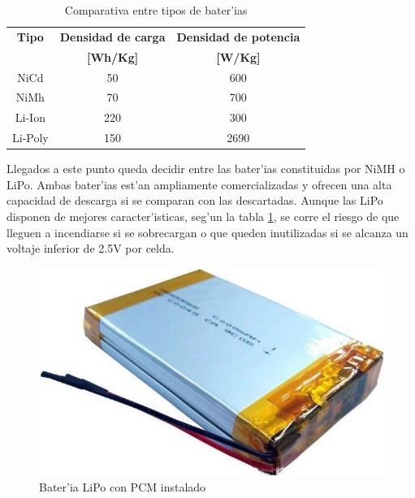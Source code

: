 \documentclass[twoside,12pt]{article}
\begin{document}
\begin{table}[ht]
\begin{center}
\begin{tabular}{|c|c|c|}
	\hline
	\textbf{Tipo} & \textbf{Densidad de carga} & \textbf{Densidad de potencia} \\ 
	\textbf{ } & \textbf{[Wh/Kg]} & \textbf{[W/Kg]} \\	\hline
	NiCd & 50 & 600 \\ \hline
	NiMh & 70 & 700 \\ \hline
	Li-Ion & 220 & 300 \\ \hline
	Li-Poly & 150 & 2690 \\ \hline

\end{tabular}
\end{center}

\caption{Comparativa entre tipos de bater'ias }
\label{tab:Battery_type_table}
\end{table}

Llegados a este punto queda decidir entre las bater'ias constituidas por NiMH o LiPo. Ambas bater'ias est'an ampliamente comercializadas y ofrecen una alta capacidad de descarga si se comparan con las descartadas. Aunque las LiPo disponen de mejores caracter'isticas, seg'un la tabla \ref{tab:Battery_type_table}, se corre el riesgo de que  lleguen a incendiarse si se sobrecargan o que queden inutilizadas si se alcanza un voltaje inferior de 2.5V por celda.\\

\begin{figure}[ht]
\centering
\includegraphics[scale=0.4]{images/Lipo_PCM.png} 
\caption{Bater'ia LiPo con PCM instalado}
\label{fig:LiPo_PCM}
\end{figure} 
\end{document}
